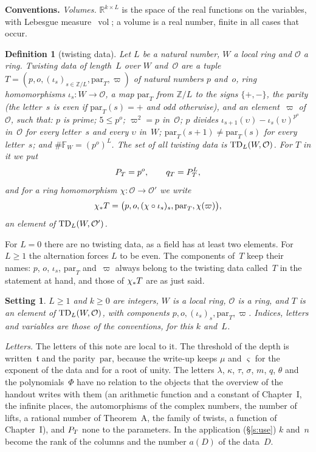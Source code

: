 \documentclass[11pt,a4paper]{article}
\makeatletter
\newcommand{\lean}[1]{\csname LN@#1\endcsname}
\newcommand{\kw}[1]{\emph{#1}}
\newcommand{\m}[1]{\mbox{$#1$}}        %
\newcommand{\leantag}{{\sffamily\bfseries\fontsize{6.3}{8}\selectfont\color{leancol}\addfontfeatures{LetterSpace=7}LEAN}}
\newcommand{\sep}{\unskip\nobreak\hspace{5pt}{\color{inkfaint}\textperiodcentered}\hspace{5pt plus 2pt}\ignorespaces}
\newcommand{\leanline}[1]{\par\nopagebreak\vspace{-2.5pt}{\fontsize{8.9}{12.4}\selectfont\color{inksoft}\raggedright
  \noindent\llap{\leantag\hspace{9pt}}#1\par}\vspace{1pt}}
\theoremstyle{plainx}
\theoremstyle{uprightx}
\newtheorem{definition}[theorem]{Definition}
\newtheorem{setting}[theorem]{Setting}          %
\newenvironment{conventions}{\par\addvspace{5pt}\noindent\textbf{Conventions.}\enspace\ignorespaces}{\par\addvspace{3pt}}
\newcommand{\cO}{\mathcal{O}}
\newcommand{\FF}{\mathbb{F}}
\newcommand{\RR}{\mathbb{R}}
\newcommand{\ZL}{\mathbb{Z}/L}
\newcommand{\vol}{\operatorname{vol}}
\newcommand{\thr}{\mathfrak{t}}        %
\newcommand{\pa}{\mathrm{par}}          %
\makeatother
\begin{document}
\begin{conventions}
\emph{Volumes.} \m{\RR^{k\times L}} is the space of the real functions on the variables, with Lebesgue
measure~\m{\vol}; a volume is a real number, finite in all cases that occur.
\end{conventions}

\begin{definition}[twisting data]\label{d:T}
Let $L$ be a natural number, $W$ a local ring and $\cO$ a ring. \kw{Twisting data of length~$L$ over $W$
and~$\cO$} are a tuple \m{T=(p,o,(\iota_s)_{s\in\ZL},\pa_T,\varpi)} of natural numbers $p$ and~$o$, ring
homomorphisms \m{\iota_s\colon W\to\cO}, a map $\pa_T$ from \m{\ZL} to the signs \m{\{+,-\}}, the \kw{parity}
(the letter~$s$ is \kw{even} if \m{\pa_T(s)=+} and \kw{odd} otherwise), and an element~$\varpi$ of~$\cO$, such
that: $p$ is prime; \m{5\le p^{o}}; \m{\varpi^{2}=p} in~$\cO$; $p$ divides \m{\iota_{s+1}(\upsilon)-\iota_s(\upsilon)^{p^{o}}}
in~$\cO$ for every letter~$s$ and every $\upsilon$ in~$W$; \m{\pa_T(s+1)\ne\pa_T(s)} for every letter~$s$; and
\m{\#\FF_W=(p^{o})^{L}}. The set of all twisting data is \m{\TwD{L}{W}{\cO}}. For $T$ in it we put
\[P_{T}=p^{o},\qquad q_{T}=P_{T}^{L},\]
and for a ring homomorphism \m{\chi\colon\cO\to\cO'} we write
\[\Tmap{\chi}{T}=\bigl(p,o,(\chi\circ\iota_s)_s,\pa_T,\chi(\varpi)\bigr),\]
an element of \m{\TwD{L}{W}{\cO'}}.
\end{definition}
\leanline{\lean{TwD}\sep \lean{PT}\sep \lean{qT}\sep \lean{Tmap}}

For \m{L=0} there are no twisting data, as a field has at least two elements. For \m{L\ge1} the alternation
forces $L$ to be even. The components of~$T$ keep their names: $p$, $o$, $\iota_s$, $\pa_T$ and~$\varpi$
always belong to the twisting data called~$T$ in the statement at hand, and those of \m{\Tmap{\chi}{T}} are as
just said.

\begin{setting}\label{set:T}
\m{L\ge1} and \m{k\ge0} are integers, $W$ is a local ring, $\cO$ is a ring, and $T$ is an element of
\m{\TwD{L}{W}{\cO}}, with components \m{p,o,(\iota_s)_s,\pa_T,\varpi}. Indices, letters and variables are
those of the conventions, for this $k$ and~$L$.
\end{setting}

\emph{Letters.} The letters of this note are local to it. The threshold of the depth is written~$\thr$ and the
parity~$\pa$, because the write-up keeps $\mu$ and $\varsigma$ for the exponent of the data and for a root of
unity. The letters $\lambda$, $\kappa$, $\tau$, $\sigma$, $m$, $q$, $\theta$ and the polynomials~$\Phi$ have no relation
to the objects that the overview of the handout writes with them (an arithmetic function and a constant of
Chapter~I, the infinite places, the automorphisms of the complex numbers, the number of lifts, a rational number
of Theorem~A, the family of twists, a function of Chapter~I), and \m{\PT{T}} none to the parameters. In the
application (§\ref{s:use}) $k$ and~$n$ become the rank of
the columns and the number \m{a(D)} of the data~$D$.
\end{document}
